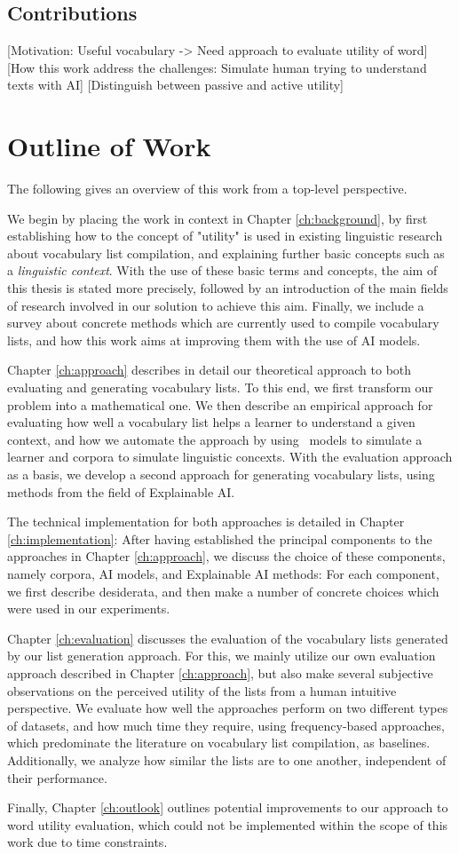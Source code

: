\subsection{Contributions}
[Motivation: Useful vocabulary -> Need approach to evaluate utility of word]
[How this work address the challenges: Simulate human trying to understand texts with AI]
[Distinguish between passive and active utility]

\section{Outline of Work}

The following gives an overview of this work from a top-level perspective.

We begin by placing the work in context in Chapter \ref{ch:background}, by first establishing how to the concept of "utility" is used in existing linguistic research about vocabulary list compilation, and explaining further basic concepts such as a \textit{linguistic context}.
With the use of these basic terms and concepts, the aim of this thesis is stated more precisely, followed by an introduction of the main fields of research involved in our solution to achieve this aim.
Finally, we include a survey about concrete methods which are currently used to compile vocabulary lists, and how this work aims at improving them with the use of AI models.

Chapter \ref{ch:approach} describes in detail our theoretical approach to both evaluating and generating vocabulary lists.
To this end, we first transform our problem into a mathematical one.
We then describe an empirical approach for evaluating how well a vocabulary list helps a learner to understand a given context, and how we automate the approach by using \AI\ models to simulate a learner and corpora to simulate linguistic concexts. 
With the evaluation approach as a basis, we develop a second approach for generating vocabulary lists, using methods from the field of Explainable AI.

The technical implementation for both approaches is detailed in Chapter \ref{ch:implementation}:
After having established the principal components to the approaches in Chapter \ref{ch:approach}, we discuss the choice of these components, namely corpora, AI models, and Explainable AI methods:
For each component, we first describe desiderata, and then make a number of concrete choices which were used in our experiments. 


Chapter \ref{ch:evaluation} discusses the evaluation of the vocabulary lists generated by our list generation approach.
For this, we mainly utilize our own evaluation approach described in Chapter \ref{ch:approach}, but also make several subjective observations on the perceived utility of the lists from a human intuitive perspective.
We evaluate how well the approaches perform on two different types of datasets, and how much time they require, using frequency-based approaches, which predominate the literature on vocabulary list compilation, as baselines.
Additionally, we analyze how similar the lists are to one another, independent of their performance. 

Finally, Chapter \ref{ch:outlook} outlines potential improvements to our approach to word utility evaluation, which could not be implemented within the scope of this work due to time constraints.





